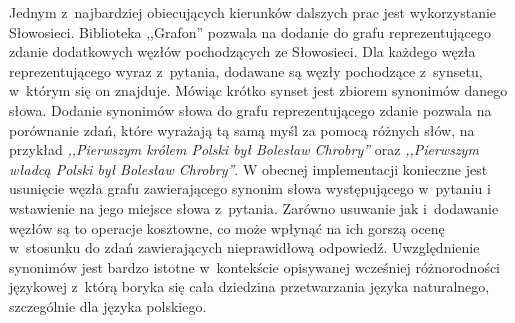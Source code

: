 \documentclass[a4paper, twoside, 12pt]{report}
\begin{document}
    Jednym z~najbardziej obiecujących kierunków dalszych prac jest wykorzystanie Słowosieci. Biblioteka ,,Grafon''
    pozwala na dodanie do grafu reprezentującego zdanie dodatkowych węzłów pochodzących ze Słowosieci. Dla każdego
    węzła reprezentującego wyraz z~pytania, dodawane są węzły pochodzące z~synsetu, w~którym się on znajduje. Mówiąc
    krótko synset jest zbiorem synonimów danego słowa. Dodanie synonimów słowa do grafu reprezentującego zdanie pozwala
    na porównanie zdań, które wyrażają tą samą myśl za pomocą różnych słów, na przykład
    \emph{,,Pierwszym królem Polski był Bolesław Chrobry''} oraz \emph{,,Pierwszym władcą Polski był Bolesław Chrobry''}.
    W obecnej implementacji konieczne jest usunięcie węzła grafu zawierającego synonim słowa występującego w~pytaniu i
    wstawienie na jego miejsce słowa z~pytania. Zarówno usuwanie jak i~dodawanie węzłów są to operacje kosztowne,
    co może wpłynąć na ich gorszą ocenę w~stosunku do zdań zawierających nieprawidłową odpowiedź. Uwzględnienie synonimów
    jest bardzo istotne w~kontekście opisywanej wcześniej różnorodności językowej z~którą boryka się cała dziedzina
    przetwarzania języka naturalnego, szczególnie dla języka polskiego.
\end{document}
